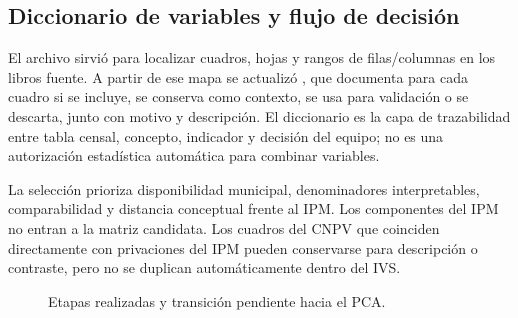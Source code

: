 \subsection{Diccionario de variables y flujo de decisión}

El archivo  sirvió para localizar cuadros, hojas y rangos de filas/columnas en los libros fuente. A partir de ese mapa se actualizó , que documenta para cada cuadro si se incluye, se conserva como contexto, se usa para validación o se descarta, junto con motivo y descripción. El diccionario es la capa de trazabilidad entre tabla censal, concepto, indicador y decisión del equipo; no es una autorización estadística automática para combinar variables.

La selección prioriza disponibilidad municipal, denominadores interpretables, comparabilidad y distancia conceptual frente al IPM. Los componentes del IPM no entran a la matriz candidata. Los cuadros del CNPV que coinciden directamente con privaciones del IPM pueden conservarse para descripción o contraste, pero no se duplican automáticamente dentro del IVS.

\begin{figure}[htbp]
\centering
{}
\caption{Etapas realizadas y transición pendiente hacia el PCA.}
\label{fig:flujo_metodologico}
\end{figure}
